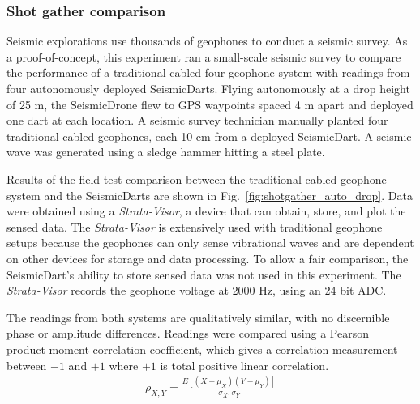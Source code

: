 \subsubsection{Shot gather comparison} 
Seismic explorations use thousands of geophones to conduct a seismic survey. 
 As a proof-of-concept, this experiment ran a small-scale seismic survey to compare the performance of a traditional cabled four geophone system with readings from four autonomously deployed SeismicDarts.
Flying autonomously at a drop height of 25 m, the SeismicDrone flew to GPS waypoints spaced 4 m apart and deployed one dart at each location. 
A seismic survey technician manually planted four traditional cabled geophones, each 10 cm from a deployed SeismicDart. 
A seismic wave was generated using a sledge hammer hitting a steel plate.

Results of the field test comparison between the traditional cabled geophone system and the SeismicDarts are shown in Fig.~\ref{fig:shotgather_auto_drop}.   
Data were obtained using a \emph{Strata-Visor}, a device that can obtain, store, and plot the sensed data. 
The \emph{Strata-Visor} is extensively used with traditional geophone setups because the geophones can only sense vibrational waves and are dependent on other devices for storage and data processing. 
To allow a fair comparison, the SeismicDart's  ability to store sensed data was not used in this experiment. 
 The \emph{Strata-Visor} records the geophone voltage at 2000 Hz, using an 24 bit ADC.

The readings from both systems are qualitatively similar, with no discernible phase or amplitude differences.
Readings were compared using a Pearson product-moment correlation coefficient, which gives a correlation measurement between $-1$ and $+1$ where $+1$ is total positive linear correlation.
\begin{align}
\rho_{X,Y} = \frac{E\left[  (X-\mu_X) (Y-\mu_Y)  \right]}{  \sigma_X, \sigma_Y}
\end{align}


